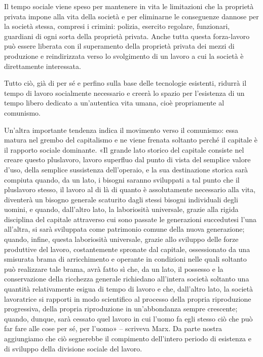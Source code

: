 \documentclass[../main]{subfiles}
\begin{document}
Il tempo sociale viene speso per mantenere in vita le limitazioni che la proprietà privata impone alla vita della società e per eliminarne le conseguenze dannose per la società stessa, compresi i crimini: polizia, esercito regolare, funzionari, guardiani di ogni sorta della proprietà privata. Anche tutta questa forza-lavoro può essere liberata con il superamento della proprietà privata dei mezzi di produzione e reindirizzata verso lo svolgimento di un lavoro a cui la società è direttamente interessata.

Tutto ciò, già di per sé e perfino sulla base delle tecnologie esistenti, ridurrà il tempo di lavoro socialmente necessario e creerà lo spazio per l'esistenza di un tempo libero dedicato a un'autentica vita umana, cioè propriamente al comunismo.

Un'altra importante tendenza indica il movimento verso il comunismo: essa matura nel grembo del capitalismo e ne viene frenata soltanto perché il capitale è il rapporto sociale dominante. «Il grande lato storico del capitale consiste nel creare questo pluslavoro, lavoro superfluo dal punto di vista del semplice valore d'uso, della semplice sussistenza dell'operaio, e la sua destinazione storica sarà compiuta quando, da un lato, i bisogni saranno sviluppati a tal punto che il pluslavoro stesso, il lavoro al di là di quanto è assolutamente necessario alla vita, diventerà un bisogno generale scaturito dagli stessi bisogni individuali degli uomini, e quando, dall'altro lato, la laboriosità universale, grazie alla rigida disciplina del capitale attraverso cui sono passate le generazioni succedutesi l'una all'altra, si sarà sviluppata come patrimonio comune della nuova generazione; quando, infine, questa laboriosità universale, grazie allo sviluppo delle forze produttive del lavoro, costantemente spronate dal capitale, ossessionato da una smisurata brama di arricchimento e operante in condizioni nelle quali soltanto può realizzare tale brama, avrà fatto sì che, da un lato, il possesso e la conservazione della ricchezza generale richiedano all'intera società soltanto una quantità relativamente esigua di tempo di lavoro e che, dall'altro lato, la società lavoratrice si rapporti in modo scientifico al processo della propria riproduzione progressiva, della propria riproduzione in un'abbondanza sempre crescente; quando, dunque, sarà cessato quel lavoro in cui l'uomo fa egli stesso ciò che può far fare alle cose per sé, per l'uomo» – scriveva Marx. Da parte nostra aggiungiamo che ciò segnerebbe il compimento dell'intero periodo di esistenza e di sviluppo della divisione sociale del lavoro.
\end{document}
